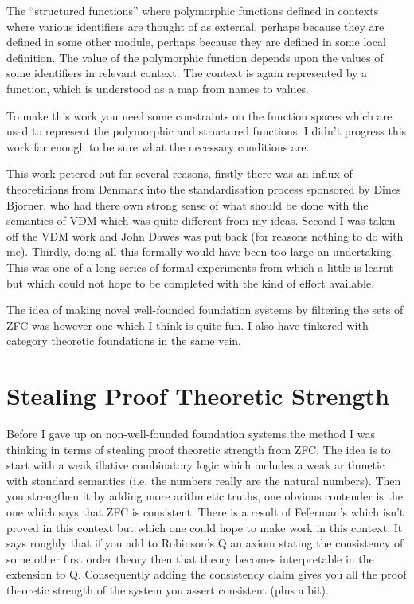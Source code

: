 \documentclass[10pt,titlepage]{book}
\begin{document}
The ``structured functions'' where polymorphic functions defined in contexts where various identifiers are thought of as external, perhaps because they are defined in some other module, perhaps because they are defined in some local definition.
The value of the polymorphic function depends upon the values of some identifiers in relevant context.
The context is again represented by a function, which is understood as a map from names to values.

To make this work you need some constraints on the function spaces which are used to represent the polymorphic and structured functions.
I didn't progress this work far enough to be sure what the necessary conditions are.

This work petered out for several reasons, firstly there was an influx of theoreticians from Denmark into the standardisation process sponsored by Dines Bjorner, who had there own strong sense of what should be done with the semantics of VDM which was quite different from my ideas.
Second I was taken off the VDM work and John Dawes was put back (for reasons nothing to do with me).
Thirdly, doing all this formally would have been too large an undertaking.
This was one of a long series of formal experiments from which a little is learnt but which could not hope to be completed with the kind of effort available.

The idea of making novel well-founded foundation systems by filtering the sets of ZFC was however one which I think is quite fun.
I also have tinkered with category theoretic foundations in the same vein.

\section{Stealing Proof Theoretic Strength}

Before I gave up on non-well-founded foundation systems the method I was thinking in terms of stealing proof theoretic strength from ZFC.
The idea is to start with a weak illative combinatory logic which includes a weak arithmetic with standard semantics (i.e. the numbers really are the natural numbers).
Then you strengthen it by adding more arithmetic truths, one obvious contender is the one which says that ZFC is consistent.
There is a result of Feferman's which isn't proved in this context but which one could hope to make work in this context.
It says roughly that if you add to Robinson's Q an axiom stating the consistency of some other first order theory then that theory becomes interpretable in the extension to Q.
Consequently adding the consistency claim gives you all the proof theoretic strength of the system you assert consistent (plus a bit).
\end{document}
